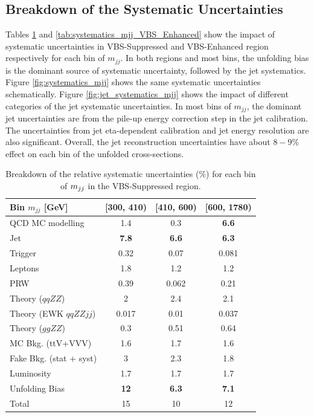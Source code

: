 \subsection{Breakdown of the Systematic Uncertainties }
\label{subsec:SysUncBreakdown}
Tables \ref{tab:systematics_mjj_VBS_Suppressed} and \ref{tab:systematics_mjj_VBS_Enhanced} show the impact of systematic uncertainties in VBS-Suppressed and VBS-Enhanced region respectively for each bin of $m_{jj}$. In both regions and most bins, the unfolding bias is the dominant source of systematic uncertainty, followed by the jet systematics. Figure \ref{fig:systematics_mjj} shows the same systematic uncertainties schematically. Figure \ref{fig:jet_systematics_mjj} shows the impact of different categories of the jet systematic uncertainties. In most bins of $m_{jj}$, the dominant jet uncertainties are from the pile-up energy correction step in the jet calibration. The uncertainties from jet eta-dependent calibration and jet energy resolution are also significant. Overall, the jet reconstruction uncertainties have about $8-9\%$ effect on each bin of the unfolded cross-sections.

\begin{table}
\centering
\begin{tabular}{|l || c | c | c | }
\hline 
Bin $m_{jj}$ [GeV] & [300, 410) & [410, 600) & [600, 1780)\\
\hline 
QCD MC modelling & 1.4 & 0.3 & \textbf{6.6 }\\
Jet & \textbf{7.8} & \textbf{6.6} & \textbf{6.3 }\\
Trigger & 0.32 & 0.07 & 0.081 \\
Leptons & 1.8 & 1.2 & 1.2 \\
PRW & 0.39 & 0.062 & 0.21\\
Theory ($qqZZ$) & 2 & 2.4 & 2.1 \\
Theory (EWK $qqZZjj$) & 0.017 & 0.01 & 0.037 \\
Theory ($ggZZ$) & 0.3 & 0.51 & 0.64 \\
MC Bkg. (ttV+VVV) & 1.6 & 1.7 & 1.6 \\
Fake Bkg. (stat + syst) & 3 & 2.3 & 1.8 \\
Luminosity & 1.7 & 1.7 & 1.7 \\
Unfolding Bias & \textbf{12} & \textbf{6.3} & \textbf{7.1}\\
\hline
Total & 15 & 10 & 12 \\
\hline
\end{tabular}
\caption{Breakdown of the relative systematic uncertainties ($\%$) for each bin of $m_{jj}$ in the VBS-Suppressed region. \label{tab:systematics_mjj_VBS_Suppressed}}
\end{table}

